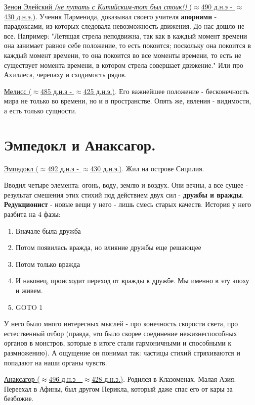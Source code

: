 \underline{Зенон Элейский \textit{(не путать с Китийским-тот был стоик!)} ($\approx$490 д.н.э - $\approx$430 д.н.э.)}. Ученик Парменида, доказывал своего учителя \textbf{апориями} - парадоксами, из которых следовала невозможность движения. До нас дошло не все. Например: "Летящая стрела неподвижна, так как в каждый момент времени она занимает равное себе положение, то есть покоится; поскольку она покоится в каждый момент времени, то она покоится во все моменты времени, то есть не существует момента времени, в котором стрела совершает движение." Или про Ахиллеса, черепаху и сходимость рядов.

\underline{Мелисс ($\approx$485 д.н.э - $\approx$425 д.н.э.)}. Его важнейшее положение - бесконечность мира не только во времени, но и в пространстве. Опять же, явления - видимости, а есть только сущности.



\section{Эмпедокл и Анаксагор.}
\underline{Эмпедокл ($\approx$492 д.н.э - $\approx$430 д.н.э.)}. Жил на острове Сицилия.

Вводил четыре элемента: огонь, воду, землю и воздух. Они вечны, а все сущее - результат смешения этих стихий под действием двух сил - \textbf{дружбы и вражды}. \textbf{Редукционист} - новые вещи у него - лишь смесь старых качеств. История у него разбита на 4 фазы:
\begin{enumerate}
\item Вначале была дружба
\item Потом появилась вражда, но влияние дружбы еще решающее
\item Потом только вражда
\item И наконец, происходит переход от вражды к дружбе. Мы именно в эту эпоху и живем.
\item GOTO 1
\end{enumerate}
У него было много интересных мыслей - про конечность скорости света, про естественный отбор (правда, это было скорее соединение нежизнеспособных органов в монстров, которые в итоге стали гармоничными и способными к размножению). А ощущение он понимал так: частицы стихий стряхиваются и попадают на наши органы чувств.

\underline{Анаксагор ($\approx$496 д.н.э - $\approx$428 д.н.э.)}. Родился в Клазоменах, Малая Азия. Переехал в Афины, был другом Перикла, который даже спас его от кары за безбожие.

